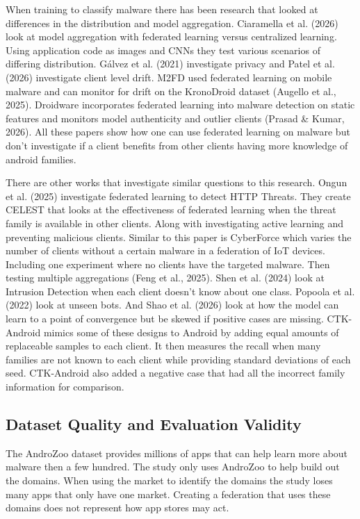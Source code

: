 \documentclass[12pt,letterpaper]{article}
\begin{document}
When training to classify malware there has been research that looked at differences in the distribution and model aggregation. Ciaramella et al. (2026) look at model aggregation with federated learning versus centralized learning. Using application code as images and CNNs they test various scenarios of differing distribution. Gálvez et al. (2021) investigate privacy and Patel et al. (2026) investigate client level drift. M2FD used federated learning on mobile malware and can monitor for drift on the KronoDroid dataset (Augello et al., 2025). Droidware incorporates federated learning into malware detection on static features and monitors model authenticity and outlier clients (Prasad \& Kumar, 2026). All these papers show how one can use federated learning on malware but don't investigate if a client benefits from other clients having more knowledge of android families.

There are other works that investigate similar questions to this research. Ongun et al. (2025) investigate federated learning to detect HTTP Threats. They create CELEST that looks at the effectiveness of federated learning when the threat family is available in other clients. Along with investigating active learning and preventing malicious clients. Similar to this paper is CyberForce which varies the number of clients without a certain malware in a federation of IoT devices. Including one experiment where no clients have the targeted malware. Then testing multiple aggregations (Feng et al., 2025). Shen et al. (2024) look at Intrusion Detection when each client doesn't know about one class. Popoola et al. (2022) look at unseen bots. And Shao et al. (2026) look at how the model can learn to a point of convergence but be skewed if positive cases are missing. CTK-Android mimics some of these designs to Android by adding equal amounts of replaceable samples to each client. It then measures the recall when many families are not known to each client while providing standard deviations of each seed. CTK-Android also added a negative case that had all the incorrect family information for comparison.

\subsection*{Dataset Quality and Evaluation Validity} 

The AndroZoo dataset provides millions of apps that can help learn more about malware then a few hundred. The study only uses AndroZoo to help build out the domains. When using the market to identify the domains the study loses many apps that only have one market. Creating a federation that uses these domains does not represent how app stores may act.
\end{document}
